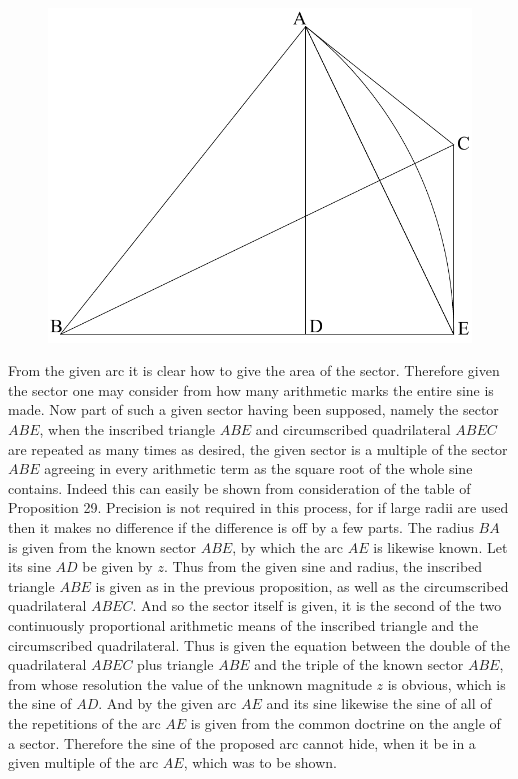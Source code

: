 \documentclass[11pt,letterpaper]{book}
\begin{document}
\begin{figure}[h!]
\includegraphics[scale=0.95]{vera_ii}
\end{figure}

From the given arc it is clear how to give the area of the sector. 
Therefore given the sector one may consider from how many arithmetic marks the
entire sine is made. 
Now part of such a given sector having been supposed, namely the
sector $ABE$, when the inscribed triangle $ABE$ and circumscribed quadrilateral
$ABEC$ are repeated as many times as desired, the given sector is a
multiple of the sector $ABE$ agreeing in every arithmetic term as the square
root of the whole sine contains. 
Indeed this can easily be shown from consideration of the table of
Proposition 29. 
Precision is not required in this process, for if large radii are
used then it makes no difference if the difference is off by a few parts. 
The radius $BA$ is given from the known sector $ABE$, by which the arc $AE$ is
likewise known. 
Let its sine $AD$ be given by $z$. 
Thus from the given sine and radius, the inscribed triangle $ABE$ is given as in
the previous proposition, as well as the circumscribed quadrilateral $ABEC$. 
And so the sector itself is given, it is the second of the two continuously
proportional arithmetic means of the inscribed triangle and the circumscribed
quadrilateral. 
Thus is given the equation between the double of the quadrilateral $ABEC$ plus
triangle $ABE$ and the triple of the known sector $ABE$, from whose resolution
the value of the unknown magnitude $z$ is obvious, which is the sine of $AD$. 
And by the given arc $AE$ and its sine likewise the sine of all of the
repetitions of the arc $AE$ is given from the common doctrine on the angle of a
sector. 
Therefore the sine of the proposed arc cannot hide, when it be in a
given multiple of the arc $AE$, which was to be shown.
\end{document}
